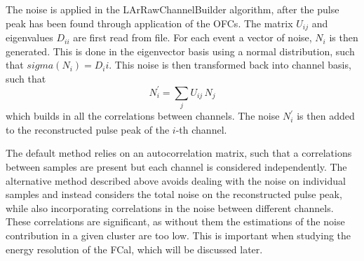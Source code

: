 The noise is applied in the LArRawChannelBuilder algorithm, after the pulse peak has been found through application of the OFCs. The matrix $U_{ij}$ and eigenvalues $D_{ii}$ are first read from file. For each event a vector of noise, $N_i$ is then generated. This is done in the eigenvector basis using a normal distribution, such that $sigma (N_i) = D_ii$. This noise is then transformed back into channel basis, such that 
\begin{equation}
N^\prime_i = \sum_j U_{ij} \, N_j
\end{equation} 
which builds in all the correlations between channels. The noise $N^\prime_i$ is then added to the reconstructed pulse peak of the $i$-th channel.

The default method relies on an autocorrelation matrix, such that a correlations between samples are present but each channel is considered independently. The alternative method described above avoids dealing with the noise on individual samples and instead considers the total noise on the reconstructed pulse peak, while also incorporating correlations in the noise between different channels. These correlations are significant, as without them the estimations of the noise contribution in a given cluster are too low. This is important when studying the energy resolution of the FCal, which will be discussed later.


%
%
%
%
%
%
%
%
%
%
%
%
%
%
%
%
%
%
%   



